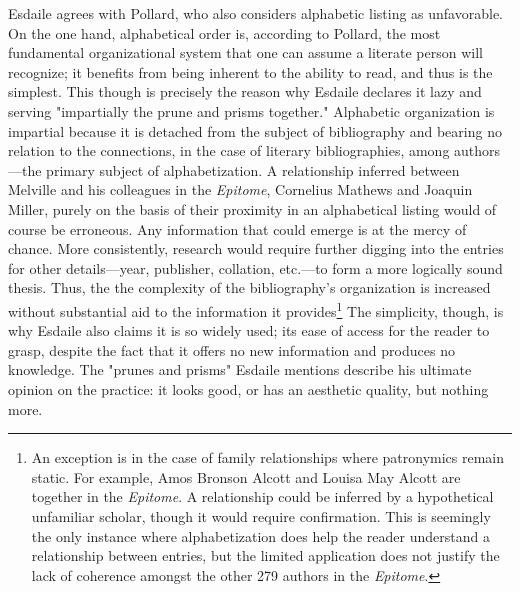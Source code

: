 Esdaile agrees with Pollard, who also considers alphabetic listing as unfavorable. On the one hand, alphabetical order is, according to Pollard, the most fundamental organizational system that one can assume a literate person will recognize; it benefits from being inherent to the ability to read, and thus is the simplest. This though is precisely the reason why Esdaile declares it lazy and serving "impartially the prune and prisms together." Alphabetic organization is impartial because it is detached from the subject of bibliography and bearing no relation to the connections, in the case of literary bibliographies, among authors---the primary subject of alphabetization. A relationship inferred between Melville and his colleagues in the \textit{Epitome}, Cornelius Mathews and Joaquin Miller, purely on the basis of their proximity in an alphabetical listing would of course be erroneous. Any information that could emerge is at the mercy of chance. More consistently, research would require further digging into the entries for other details---year, publisher, collation, etc.---to form a more logically sound thesis. Thus, the the complexity of the bibliography's organization is increased without substantial aid to the information it provides\footnote{An exception is in the case of family relationships where patronymics remain static. For example, Amos Bronson Alcott and Louisa May Alcott are together in the \textit{Epitome}. A relationship could be inferred by a hypothetical unfamiliar scholar, though it would require confirmation. This is seemingly the only instance where alphabetization does help the reader understand a relationship between entries, but the limited application does not justify the lack of coherence amongst the other 279 authors in the \textit{Epitome}.} The simplicity, though, is why Esdaile also claims it is so widely used; its ease of access for the reader to grasp, despite the fact that it offers no new information and produces no knowledge. The "prunes and prisms" Esdaile mentions describe his ultimate opinion on the practice: it looks good, or has an aesthetic quality, but nothing more.

